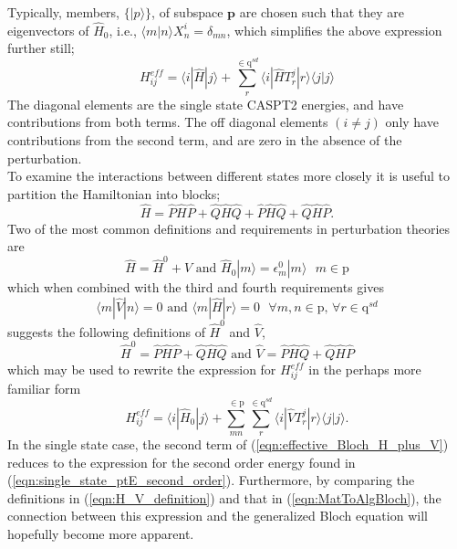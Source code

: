 \noindent Typically, members, $\{|p\rangle \}$, of subspace $\mathbf{p}$ are chosen such that they are 
eigenvectors of $\hat{H}_{0}$, i.e., $\langle m | n \rangle X^{i}_{n} = \delta_{mn}$,
which simplifies the above expression further still; 
\begin{equation}
H^{eff}_{ij} = 
\langle i | \hat{H} | j \rangle
+\sum_{r}^{\in \mathrm{q}^{sd}}
\langle i | \hat{H} T^{j}_{r} |r \rangle\langle j | j \rangle
\label{eqn:effective_Bloch_summation_explicit_diag}
\end{equation}
The diagonal elements are the single state CASPT2 energies, and have contributions from both terms.
The off diagonal elements $(i \neq j)$ only have contributions from the second term, 
and are zero in the absence of the perturbation. \\

\noindent To examine the interactions between different states more closely it is useful to partition the Hamiltonian into blocks;
\begin{equation*}
\hat{H} = 
\hat{P}\hat{H}\hat{P}+ \hat{Q}\hat{H}\hat{Q}+ 
\hat{P}\hat{H}\hat{Q}+ \hat{Q}\hat{H}\hat{P}.
\end{equation*}
\noindent Two of the most common definitions and requirements in perturbation theories are
\begin{equation*}
\hat{H} = \hat{H}^{0}+\hat{V} 
\text{ \ \ \ and \ \ \ }
\hat{H}_{0} |m \rangle = \epsilon^{0}_{m}|m\rangle \text{ \ \ } m \in \mathrm{p} 
\end{equation*}
which when combined with the third and fourth requirements gives
\begin{equation}
\langle m| \hat{V} |n \rangle = 0 
\text{ \ \ and  \ \ }
\langle m| \hat{H} |r \rangle = 0 \text{ \ \ } \forall m,n \in \mathrm{p} \text{,\ \ } \forall r \in \mathrm{q}^{sd} 
\label{eqn:V_H_are_same_def}
\end{equation}
suggests the following definitions of $\hat{H}^{0}$ and $\hat{V}$,
\begin{equation}
\hat{H}^{0}  = \hat{P}\hat{H}\hat{P}+ \hat{Q}\hat{H}\hat{Q}
\text{ \ \ \ and \ \ \ } \hat{V}  =  \hat{P}\hat{H}\hat{Q}+ \hat{Q}\hat{H}\hat{P}
\label{eqn:H_V_definition}
\end{equation}
which may be used to rewrite the expression for $H^{eff}_{ij}$ in the perhaps more familiar form
\begin{equation}
H^{eff}_{ij} =  
\langle i | \hat{H}_{0} | j \rangle
+\sum_{mn}^{\in \mathrm{p} }\sum_{r}^{\in \mathrm{q}^{sd}}
\langle i | \hat{V} T^{j}_{r} |r \rangle\langle j | j \rangle.
\label{eqn:effective_Bloch_H_plus_V}
\end{equation}
In the single state case, the second term of (\ref{eqn:effective_Bloch_H_plus_V}) reduces to the
expression for the second order energy found in (\ref{eqn:single_state_ptE_second_order}). Furthermore, by comparing 
the definitions in (\ref{eqn:H_V_definition}) and that in (\ref{eqn:MatToAlgBloch}), the
connection between this expression and the generalized Bloch equation will hopefully become 
more apparent.\\

